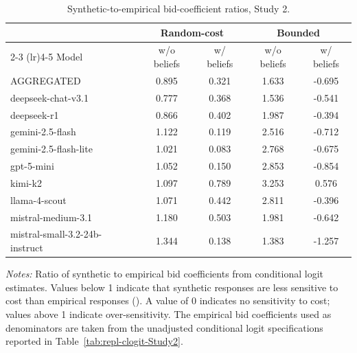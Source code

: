 \begin{table}[h]
\centering
\caption{Synthetic-to-empirical bid-coefficient ratios, Study 2.}
\label{tab:slope-ratios-Study2}
\begin{threeparttable}
\footnotesize
\begin{tabular}{lcccc}
\toprule
 & \multicolumn{2}{c}{Random-cost} & \multicolumn{2}{c}{Bounded} \\
\cmidrule(lr){2-3} \cmidrule(lr){4-5}
Model & w/o beliefs & w/ beliefs & w/o beliefs & w/ beliefs \\
\midrule
AGGREGATED &  0.895 &  0.321 &  1.633 & -0.695 \\
\midrule
deepseek-chat-v3.1 &  0.777 &  0.368 &  1.536 & -0.541 \\
deepseek-r1 &  0.866 &  0.402 &  1.987 & -0.394 \\
gemini-2.5-flash &  1.122 &  0.119 &  2.516 & -0.712 \\
gemini-2.5-flash-lite &  1.021 &  0.083 &  2.768 & -0.675 \\
gpt-5-mini &  1.052 &  0.150 &  2.853 & -0.854 \\
kimi-k2 &  1.097 &  0.789 &  3.253 &  0.576 \\
llama-4-scout &  1.071 &  0.442 &  2.811 & -0.396 \\
mistral-medium-3.1 &  1.180 &  0.503 &  1.981 & -0.642 \\
mistral-small-3.2-24b-instruct &  1.344 &  0.138 &  1.383 & -1.257 \\
\bottomrule
\end{tabular}
\begin{tablenotes}\footnotesize
\item \textit{Notes:} Ratio of synthetic to empirical bid coefficients from conditional logit estimates. 
Values below 1 indicate that synthetic responses are less sensitive to cost than empirical responses (). 
A value of 0 indicates no sensitivity to cost; values above 1 indicate over-sensitivity. 
The empirical bid coefficients used as denominators are taken from the unadjusted conditional logit specifications reported in Table~\ref{tab:repl-clogit-Study2}.
\end{tablenotes}
\end{threeparttable}
\end{table}

